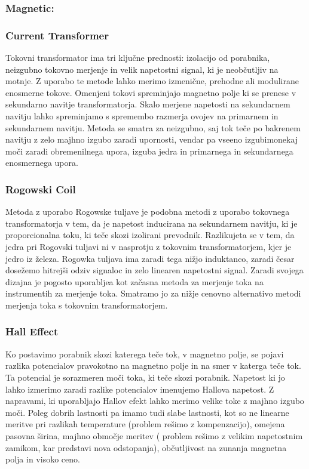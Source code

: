 \documentclass[12pt,a4paper,titlepage,openany]{report}
\begin{document}
\subsubsection{Magnetic:}
\subsubsection{Current Transformer}
Tokovni transformator ima tri ključne prednosti: izolacijo od porabnika, neizgubno tokovno merjenje in velik napetostni signal, ki je neobčutljiv na motnje. Z uporabo te metode lahko merimo izmenične, prehodne ali modulirane enosmerne tokove. Omenjeni tokovi spreminjajo magnetno polje ki se prenese v sekundarno navitje transformatorja. Skalo merjene napetosti na sekundarnem navitju lahko spreminjamo s spremembo razmerja ovojev na primarnem in sekundarnem navitju. Metoda se smatra za neizgubno, saj tok teče po bakrenem navitju z zelo majhno izgubo zaradi upornosti, vendar pa vseeno izgubimonekaj moči zaradi obremenilnega upora, izguba jedra in primarnega in sekundarnega enosmernega upora.

\subsubsection{Rogowski Coil}
Metoda z uporabo Rogowske tuljave je podobna metodi z uporabo tokovnega transformatorja v tem, da je napetost inducirana na sekundarnem navitju, ki je proporcionalna toku, ki teče skozi izolirani prevodnik. Razlikujeta se v tem, da jedra pri Rogovski tuljavi ni v nasprotju z tokovnim transformatorjem, kjer je jedro iz železa. Rogowka tuljava ima zaradi tega nižjo induktanco, zaradi česar dosežemo hitrejši odziv signaloc in zelo linearen napetostni signal. Zaradi svojega dizajna je pogosto uporabljea kot začasna metoda za merjenje toka na instrumentih za merjenje toka. Smatramo jo za nižje cenovno alternativo metodi merjenja toka s tokovnim transformatorjem.

\subsubsection{Hall Effect}
Ko postavimo porabnik skozi katerega teče tok, v magnetno polje, se pojavi razlika potencialov pravokotno na magnetno polje in na smer v katerga teče tok. Ta potencial je sorazmeren moči toka, ki teče skozi porabnik. Napetost ki jo lahko izmerimo zaradi razlike potencialov imenujemo Hallova napetost. Z napravami, ki uporabljajo Hallov efekt lahko merimo velike toke z majhno izgubo moči. Poleg dobrih lastnosti pa imamo tudi slabe lastnosti, kot so ne linearne meritve pri razlikah temperature (problem rešimo z kompenzacijo), omejena pasovna širina, majhno območje meritev ( problem rešimo z velikim napetostnim zamikom, kar predstavi nova odstopanja), občutljivost na zunanja magnetna polja in visoko ceno.
\end{document}

